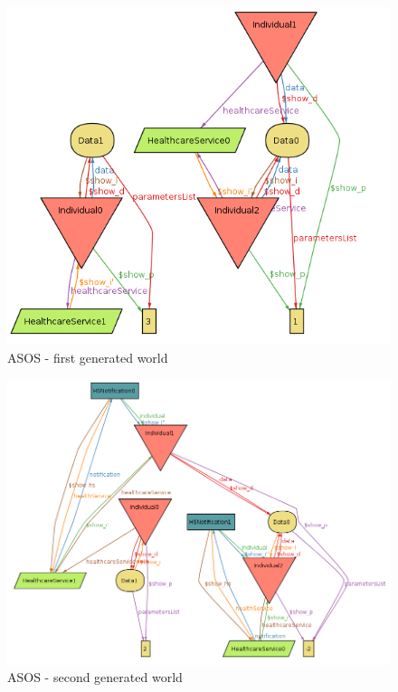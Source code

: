 \documentclass[a4paper, hidelinks, 12pt]{report}
\begin{document}
	\begin{figure}[H]
		\centering
		\includegraphics[scale=0.55]{Diagrams/goal_5_world_1.png}
		\caption[ASOS - first generated world]{ASOS - first generated world}
		\label{fig:goal_5_world_1}
	\end{figure}
	
	\begin{figure}[H]
		\centering
		\includegraphics[scale=0.5]{Diagrams/goal_5_world_2.png}
		\caption[ASOS - second generated world]{ASOS - second generated world}
		\label{fig:goal_5_world_2}
	\end{figure}
	
\end{document}
